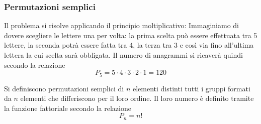 \documentclass{article}     %
\begin{document}
            \subsubsection{Permutazioni semplici} 
            \begin{ex}
            
            
            Il problema si risolve applicando il principio moltiplicativo: Immaginiamo di dovere scegliere le lettere una per volta: la prima scelta può essere effettuata tra 5 lettere, la seconda potrà essere fatta tra 4, la terza tra 3 e così via fino all'ultima lettera la cui scelta sarà obbligata. Il numero di anagrammi si ricaverà quindi secondo la relazione \[P_5=5\cdot4\cdot3\cdot2\cdot1=120\]
            \end{ex}
            \begin{boxdef}
                Si definiscono permutazioni semplici di $n$ elementi distinti tutti i gruppi formati da $n$ elementi che differiscono per il loro ordine. Il loro numero è definito tramite la funzione fattoriale secondo la relazione \[P_n=n!\]
            \end{boxdef}
            
\end{document}
